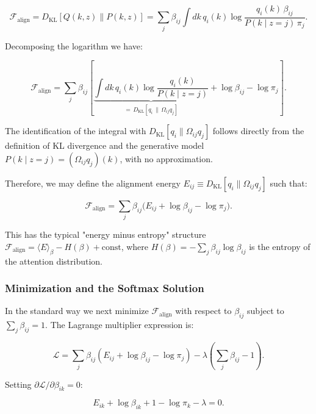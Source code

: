 \documentclass[twoside,11pt]{article}
\begin{document}
\begin{equation}
\mathcal{F}_{\text{align}} = D_{\mathrm{KL}}[Q(k,z) \| P(k,z)] = \sum_j \beta_{ij} \int dk\, q_i(k) \log \frac{q_i(k)\, \beta_{ij}}{P(k \mid z{=}j)\, \pi_j}.
\end{equation}

Decomposing the logarithm we have:

\begin{equation}
\mathcal{F}_{\text{align}} = \sum_j \beta_{ij} \left[ \underbrace{\int dk\, q_i(k) \log \frac{q_i(k)}{P(k \mid z{=}j)}}_{= \, D_{\mathrm{KL}}[q_i \,\|\, \Omega_{ij} q_j]} + \log \beta_{ij} - \log \pi_j \right].
\label{eq:mixture_free_energy}
\end{equation}

The identification of the integral with $D_{\mathrm{KL}}[q_i \| \Omega_{ij} q_j]$ follows directly from the definition of KL divergence and the generative model $P(k \mid z{=}j) = (\Omega_{ij} q_j)(k)$, with no approximation.

Therefore, we may define the alignment energy $E_{ij} \equiv D_{\mathrm{KL}}[q_i \| \Omega_{ij} q_j]$ such that:

\begin{equation}
\mathcal{F}_{\text{align}} = \sum_j \beta_{ij} \big( E_{ij} + \log \beta_{ij} - \log \pi_j \big).
\label{eq:mixture_energy_entropy}
\end{equation}

This has the typical "energy minus entropy" structure $\mathcal{F}_{\text{align}} = \langle E \rangle_\beta - H(\beta) + \text{const}$, where $H(\beta) = -\sum_j \beta_{ij} \log \beta_{ij}$ is the entropy of the attention distribution.

\subsubsection{Minimization and the Softmax Solution}

In the standard way we next minimize $\mathcal{F}_{\text{align}}$ with respect to $\beta_{ij}$ subject to $\sum_j \beta_{ij} = 1$. The Lagrange multiplier expression is:

\begin{equation}
\mathcal{L} = \sum_j \beta_{ij}(E_{ij} + \log \beta_{ij} - \log \pi_j) - \lambda\left(\sum_j \beta_{ij} - 1\right).
\end{equation}

Setting $\partial \mathcal{L} / \partial \beta_{ik} = 0$:

\begin{equation}
E_{ik} + \log \beta_{ik} + 1 - \log \pi_k - \lambda = 0.
\end{equation}
\end{document}
